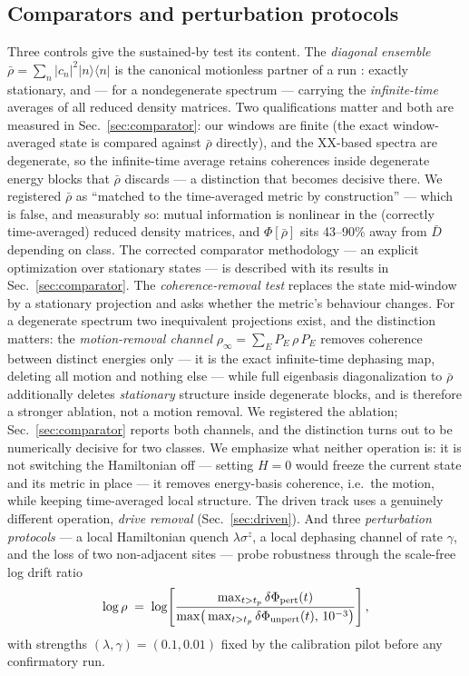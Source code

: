 \documentclass[a4paper,11pt,noarxiv]{quantumarticle}
\newcommand{\logr}{\log\rho}
\begin{document}
\subsection{Comparators and perturbation protocols}\label{sec:protocols}

Three controls give the sustained-by test its content. The
\emph{diagonal ensemble} $\bar\rho = \sum_n |c_n|^2
|n\rangle\langle n|$ is the canonical motionless partner of a run
\cite{SRC065,SRC066}: exactly stationary, and --- for a nondegenerate
spectrum --- carrying the \emph{infinite-time} averages of all reduced
density matrices. Two qualifications matter and both are measured in
Sec.~\ref{sec:comparator}: our windows are finite (the exact
window-averaged state is compared against $\bar\rho$ directly), and
the XX-based spectra are degenerate, so the infinite-time average
retains coherences inside degenerate energy blocks that $\bar\rho$
discards --- a distinction that becomes decisive there. We registered
$\bar\rho$ as ``matched to the time-averaged metric by construction''
--- which is false, and measurably so: mutual information is nonlinear
in the (correctly time-averaged) reduced density matrices, and
$\Phi[\bar\rho]$ sits 43--90\% away from $\bar D$ depending on class. The corrected comparator methodology --- an
explicit optimization over stationary states --- is described with its
results in Sec.~\ref{sec:comparator}. The \emph{coherence-removal test}
replaces the state mid-window by a stationary projection and asks
whether the metric's behaviour changes. For a degenerate spectrum two
inequivalent projections exist, and the distinction matters: the
\emph{motion-removal channel} $\rho_\infty = \sum_E P_E\,\rho\,P_E$
removes coherence between distinct energies only --- it is the exact
infinite-time dephasing map, deleting all motion and nothing else ---
while full eigenbasis diagonalization to $\bar\rho$ additionally
deletes \emph{stationary} structure inside degenerate blocks, and is
therefore a stronger ablation, not a motion removal. We registered the
ablation; Sec.~\ref{sec:comparator} reports both channels, and the
distinction turns out to be numerically decisive for two classes. We
emphasize what neither operation is: it is not switching the
Hamiltonian off --- setting $H=0$ would freeze the current state and
its metric in place --- it removes energy-basis coherence, i.e.\ the
motion, while keeping time-averaged local structure. The driven
track uses a genuinely different operation, \emph{drive removal}
(Sec.~\ref{sec:driven}). And three \emph{perturbation
protocols} --- a local Hamiltonian quench $\lambda\sigma^z$, a local
dephasing channel of rate $\gamma$, and the loss of two non-adjacent
sites --- probe robustness through the scale-free log drift ratio
\begin{equation}
\logr \;=\; \log\!\left[\frac{\max_{t>t_p}\delta\Phi_{\rm pert}(t)}
{\max\!\big(\max_{t>t_p}\delta\Phi_{\rm unpert}(t),\,10^{-3}\big)}
\right],
\end{equation}
with strengths $(\lambda, \gamma) = (0.1, 0.01)$ fixed by the
calibration pilot before any confirmatory run.
\end{document}
